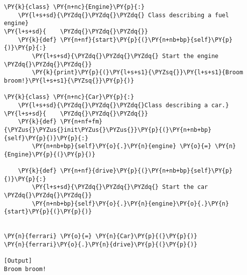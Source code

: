 \begin{Verbatim}[label=\makebox{\url{https://github.com/lucabaldini/cmepda/tree/master/slides/latex/snippets/composition.py}},commandchars=\\\{\}]
\PY{k}{class} \PY{n+nc}{Engine}\PY{p}{:}
    \PY{l+s+sd}{\PYZdq{}\PYZdq{}\PYZdq{} Class describing a fuel engine}
\PY{l+s+sd}{    \PYZdq{}\PYZdq{}\PYZdq{}}
    \PY{k}{def} \PY{n+nf}{start}\PY{p}{(}\PY{n+nb+bp}{self}\PY{p}{)}\PY{p}{:}
        \PY{l+s+sd}{\PYZdq{}\PYZdq{}\PYZdq{} Start the engine \PYZdq{}\PYZdq{}\PYZdq{}}
        \PY{k}{print}\PY{p}{(}\PY{l+s+s1}{\PYZsq{}}\PY{l+s+s1}{Broom broom!}\PY{l+s+s1}{\PYZsq{}}\PY{p}{)}

\PY{k}{class} \PY{n+nc}{Car}\PY{p}{:}
    \PY{l+s+sd}{\PYZdq{}\PYZdq{}\PYZdq{}Class describing a car.}
\PY{l+s+sd}{    \PYZdq{}\PYZdq{}\PYZdq{}}
    \PY{k}{def} \PY{n+nf+fm}{\PYZus{}\PYZus{}init\PYZus{}\PYZus{}}\PY{p}{(}\PY{n+nb+bp}{self}\PY{p}{)}\PY{p}{:}
        \PY{n+nb+bp}{self}\PY{o}{.}\PY{n}{engine} \PY{o}{=} \PY{n}{Engine}\PY{p}{(}\PY{p}{)}
      
    \PY{k}{def} \PY{n+nf}{drive}\PY{p}{(}\PY{n+nb+bp}{self}\PY{p}{)}\PY{p}{:}
        \PY{l+s+sd}{\PYZdq{}\PYZdq{}\PYZdq{} Start the car \PYZdq{}\PYZdq{}\PYZdq{}}
        \PY{n+nb+bp}{self}\PY{o}{.}\PY{n}{engine}\PY{o}{.}\PY{n}{start}\PY{p}{(}\PY{p}{)}
    

\PY{n}{ferrari} \PY{o}{=} \PY{n}{Car}\PY{p}{(}\PY{p}{)}
\PY{n}{ferrari}\PY{o}{.}\PY{n}{drive}\PY{p}{(}\PY{p}{)}

[Output]
Broom broom!
\end{Verbatim}